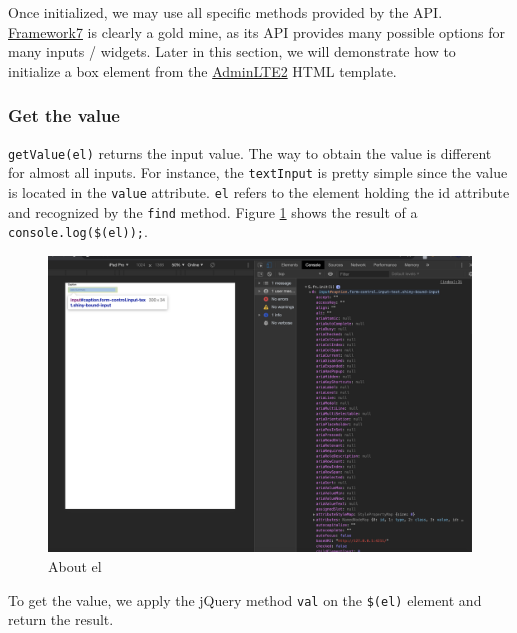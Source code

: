 \documentclass[
]{book}
\begin{document}
Once initialized, we may use all specific methods provided by the API. \href{https://framework7.io}{Framework7} is clearly a gold mine, as its API provides many possible options for many inputs / widgets. Later in this section, we will demonstrate how to initialize a box element from the \href{https://adminlte.io/docs/2.4/js-box-widget}{AdminLTE2} HTML template.

\hypertarget{get-the-value}{%
\subsubsection{Get the value}\label{get-the-value}}

\texttt{getValue(el)} returns the input value. The way to obtain the value is different for almost all inputs. For instance, the \texttt{textInput} is pretty simple since the value is located in the \texttt{value} attribute. \texttt{el} refers to the element holding the id attribute and recognized by the \texttt{find} method. Figure \ref{fig:shiny-el} shows the result of a \texttt{console.log(\$(el));}.

\begin{figure}
\includegraphics[width=35.5in]{images/survival-kit/shiny-el} \caption{About el}\label{fig:shiny-el}
\end{figure}

To get the value, we apply the jQuery method \texttt{val} on the \texttt{\$(el)} element and return the result.
\end{document}
